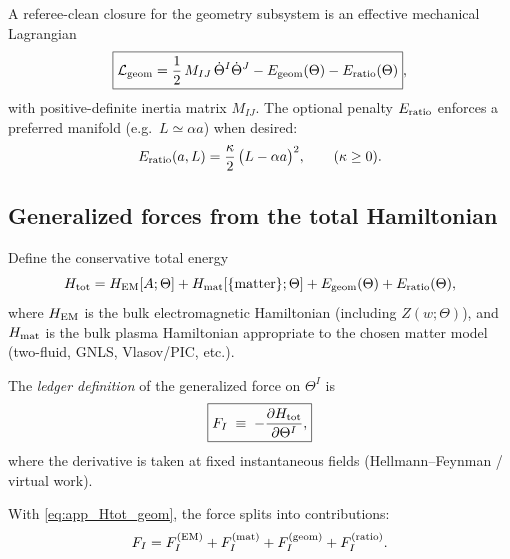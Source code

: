 \documentclass[11pt]{article}
\begin{document}
A referee-clean closure for the geometry subsystem is an effective mechanical Lagrangian
\begin{equation}
\boxed{
\mathcal{L}_{\rm geom}
=
\frac12\,M_{IJ}\,\dot\Theta^I\dot\Theta^J
-
E_{\rm geom}(\Theta)
-
E_{\rm ratio}(\Theta)
},
\label{eq:app_Lgeom_general}
\end{equation}
with positive-definite inertia matrix \(M_{IJ}\). The optional penalty \(E_{\rm ratio}\) enforces
a preferred manifold (e.g.\ \(L\simeq \alpha a\)) when desired:
\begin{equation}
E_{\rm ratio}(a,L)=\frac{\kappa}{2}\,\bigl(L-\alpha a\bigr)^2,
\qquad (\kappa\ge 0).
\label{eq:app_Eratio}
\end{equation}

\subsection{Generalized forces from the total Hamiltonian}
\label{app:geom_forces}

Define the conservative total energy
\begin{equation}
H_{\rm tot}
=
H_{\rm EM}[A;\Theta]
+
H_{\rm mat}[\{\text{matter}\};\Theta]
+
E_{\rm geom}(\Theta)
+
E_{\rm ratio}(\Theta),
\label{eq:app_Htot_geom}
\end{equation}
where \(H_{\rm EM}\) is the bulk electromagnetic Hamiltonian (including \(Z(w;\Theta)\)),
and \(H_{\rm mat}\) is the bulk plasma Hamiltonian appropriate to the chosen matter model
(two-fluid, GNLS, Vlasov/PIC, etc.).

The \emph{ledger definition} of the generalized force on \(\Theta^I\) is
\begin{equation}
\boxed{
F_I \;\equiv\; -\frac{\partial H_{\rm tot}}{\partial \Theta^I},
}
\label{eq:app_generalized_force_def}
\end{equation}
where the derivative is taken at fixed instantaneous fields (Hellmann--Feynman / virtual work).

With \eqref{eq:app_Htot_geom}, the force splits into contributions:
\begin{equation}
F_I = F_I^{({\rm EM})}+F_I^{({\rm mat})}+F_I^{({\rm geom})}+F_I^{({\rm ratio})}.
\end{equation}
\end{document}
